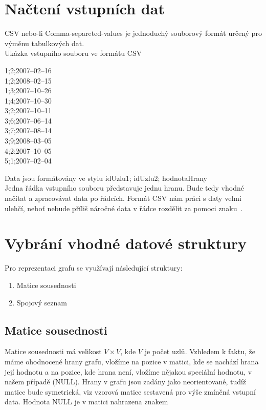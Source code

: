 \section{Načtení vstupních dat}
CSV nebo-li Comma-separeted-values je jednoduchý souborový formát určený pro výměnu tabulkových dat.\\

Ukázka vstupního souboru ve formátu CSV
\begin{framed}
	1;2;2007--02--16\\
	1;2;2008--02--15\\
	1;3;2007--10--26\\
	1;4;2007--10--30\\
	3;2;2007--10--11\\
	3;6;2007--06--14\\
	3;7;2007--08--14\\
	3;9;2008--03--05\\
	4;2;2007--10--05\\
	5;1;2007--02--04
\end{framed}

Data jsou formátovány ve stylu idUzlu1; idUzlu2; hodnotaHrany\\

Jedna řádka vstupního souboru představuje jednu hranu. Bude tedy vhodné načítat a zpracovávat data po řádcích. Formát CSV nám práci s daty velmi ulehčí, neboť nebude příliš náročné data v řádce rozdělit za pomoci znaku~\uv{\textbf{;}}.

\section{Vybrání vhodné datové struktury}
Pro reprezentaci grafu se využívají následující struktury:
\begin{enumerate}
	\item Matice sousednosti
	\item Spojový seznam
\end{enumerate}

\subsection{Matice sousednosti}
Matice sousednosti má velikost $V \times V$, kde $V$ je počet uzlů. Vzhledem k faktu, že máme ohodnocené hrany grafu, vložíme na pozice v matici, kde se nachází hrana její hodnotu a na pozice, kde hrana není, vložíme nějakou speciální hodnotu, v našem případě (NULL). Hrany v grafu jsou zadány jako neorientované, tudíž matice bude symetrická, viz vzorová matice sestavená pro výše zmíněná vstupní data. Hodnota NULL je v matici nahrazena znakem \uv{--}\\

